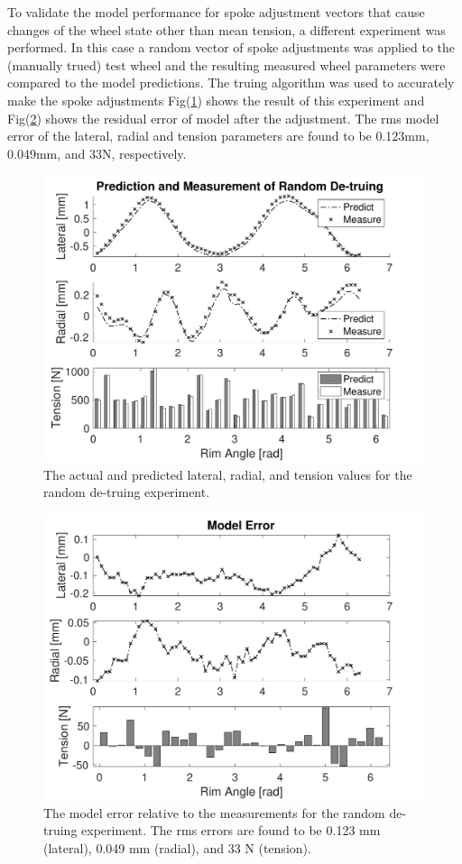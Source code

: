 \documentclass[journal]{IEEEtran}
\begin{document}
To validate the model performance for spoke adjustment vectors that cause changes of the wheel state other than mean tension, a different experiment was performed.  In this case a random vector of spoke adjustments was applied to the (manually trued) test wheel and the resulting measured wheel parameters were compared to the model predictions. The truing algorithm was used to accurately make the spoke adjustments  Fig(\ref{fig:exp1}) shows the result of this experiment and Fig(\ref{fig:exp1_err}) shows the residual error of model after the adjustment. The rms model error of the lateral, radial and tension parameters are found to be 0.123mm, 0.049mm, and 33N, respectively. 

\begin{figure}[!t]
\centering
\includegraphics[width=3.25 in]{./figs/exp1}
\caption{The actual and predicted lateral, radial, and tension values for the random de-truing experiment.}
\label{fig:exp1}
\end{figure}

\begin{figure}[!t]
\centering
\includegraphics[width=3.25 in]{./figs/exp1_err}
\caption{The model error relative to the measurements for the random de-truing experiment.  The rms errors are found to be 0.123 mm (lateral), 0.049 mm (radial), and 33 N (tension).}
\label{fig:exp1_err}
\end{figure}
\end{document}
